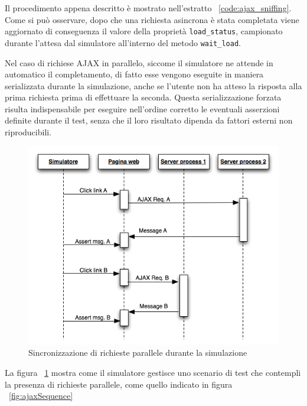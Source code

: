 \documentclass[12pt]{toptesi}
\begin{document}


Il procedimento appena descritto è mostrato nell'estratto ~\ref{code:ajax_sniffing}. Come si può osservare, dopo che una richiesta asincrona è stata completata viene aggiornato di conseguenza il valore della proprietà \verb|load_status|, campionato durante l'attesa dal simulatore all'interno del metodo \verb|wait_load|.

Nel caso di richiese AJAX in parallelo, siccome il simulatore ne attende in automatico il completamento, di fatto esse vengono eseguite in maniera serializzata durante la simulazione, anche se l'utente non ha atteso la risposta alla prima richiesta prima di effettuare la seconda. Questa serializzazione forzata risulta indispensabile per eseguire nell'ordine corretto le eventuali asserzioni definite durante il test, senza che il loro risultato dipenda da fattori esterni non riproducibili.

\begin{figure}[htbp]
\begin{center}
\includegraphics[width=\textwidth]{images/ajax_sync_for_simulation.png}
\caption{Sincronizzazione di richieste parallele durante la simulazione}
\label{fig:ajaxParallelSimulation}
\end{center}
\end{figure}

La figura ~\ref{fig:ajaxParallelSimulation} mostra come il simulatore gestisce uno scenario di test che contempli la presenza di richieste parallele, come quello indicato in figura ~\ref{fig:ajaxSequence}
\end{document}
